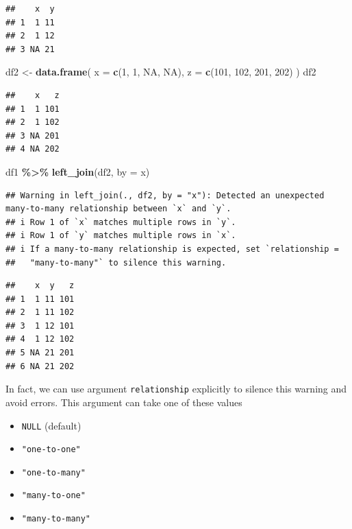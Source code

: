 \documentclass[
]{book}
\newenvironment{Shaded}{\begin{snugshade}}{\end{snugshade}}
\newcommand{\AttributeTok}[1]{\textcolor[rgb]{0.13,0.29,0.53}{#1}}
\newcommand{\ConstantTok}[1]{\textcolor[rgb]{0.56,0.35,0.01}{#1}}
\newcommand{\DecValTok}[1]{\textcolor[rgb]{0.00,0.00,0.81}{#1}}
\newcommand{\FunctionTok}[1]{\textcolor[rgb]{0.13,0.29,0.53}{\textbf{#1}}}
\newcommand{\NormalTok}[1]{#1}
\newcommand{\OtherTok}[1]{\textcolor[rgb]{0.56,0.35,0.01}{#1}}
\newcommand{\SpecialCharTok}[1]{\textcolor[rgb]{0.81,0.36,0.00}{\textbf{#1}}}
\newcommand{\StringTok}[1]{\textcolor[rgb]{0.31,0.60,0.02}{#1}}
\providecommand{\tightlist}{%
  \setlength{\itemsep}{0pt}\setlength{\parskip}{0pt}}
\begin{document}
\begin{verbatim}
##    x  y
## 1  1 11
## 2  1 12
## 3 NA 21
\end{verbatim}

\begin{Shaded}
\begin{Highlighting}[]
\NormalTok{df2 }\OtherTok{\textless{}{-}} \FunctionTok{data.frame}\NormalTok{(}
  \AttributeTok{x =} \FunctionTok{c}\NormalTok{(}\DecValTok{1}\NormalTok{, }\DecValTok{1}\NormalTok{, }\ConstantTok{NA}\NormalTok{, }\ConstantTok{NA}\NormalTok{),}
  \AttributeTok{z =} \FunctionTok{c}\NormalTok{(}\DecValTok{101}\NormalTok{, }\DecValTok{102}\NormalTok{, }\DecValTok{201}\NormalTok{, }\DecValTok{202}\NormalTok{)}
\NormalTok{)}
\NormalTok{df2}
\end{Highlighting}
\end{Shaded}

\begin{verbatim}
##    x   z
## 1  1 101
## 2  1 102
## 3 NA 201
## 4 NA 202
\end{verbatim}

\begin{Shaded}
\begin{Highlighting}[]
\NormalTok{df1 }\SpecialCharTok{\%\textgreater{}\%} \FunctionTok{left\_join}\NormalTok{(df2, }\AttributeTok{by =} \StringTok{\textquotesingle{}x\textquotesingle{}}\NormalTok{)}
\end{Highlighting}
\end{Shaded}

\begin{verbatim}
## Warning in left_join(., df2, by = "x"): Detected an unexpected many-to-many relationship between `x` and `y`.
## i Row 1 of `x` matches multiple rows in `y`.
## i Row 1 of `y` matches multiple rows in `x`.
## i If a many-to-many relationship is expected, set `relationship =
##   "many-to-many"` to silence this warning.
\end{verbatim}

\begin{verbatim}
##    x  y   z
## 1  1 11 101
## 2  1 11 102
## 3  1 12 101
## 4  1 12 102
## 5 NA 21 201
## 6 NA 21 202
\end{verbatim}

In fact, we can use argument \texttt{relationship} explicitly to silence this warning and avoid errors. This argument can take one of these values

\begin{itemize}
\tightlist
\item
  \texttt{NULL} (default)
\item
  \texttt{"one-to-one"}
\item
  \texttt{"one-to-many"}
\item
  \texttt{"many-to-one"}
\item
  \texttt{"many-to-many"}
\end{itemize}
\end{document}
